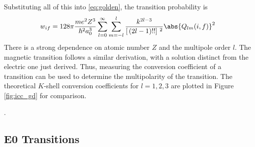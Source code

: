 Substituting all of this into \ref{eq:golden}, the transition probability is
\begin{equation}
    w_{if}=128\pi\frac{me^2Z^3}{\hbar^2a_0^3} \sum_{l=0}^\infty\sum_{m=-l}^{l} \frac{k^{2l-3}}{\left[\,(2l-1)!!\right]\,^2}\abs{Q_{lm}(i,f)}^2
\end{equation}
There is a strong dependence on atomic number $Z$ and the multipole order $l$. The magnetic transition follows a similar derivation, with a solution distinct from the electric one just derived. Thus, measuring the conversion coefficient of a transition can be used to determine the multipolarity of the transition. The theoretical $K$-shell conversion coefficients for $l=1,2,3$ are plotted in Figure \ref{fig:icc_gd} for comparison.

.

\subsection{E0 Transitions}
\label{sec:E0}

